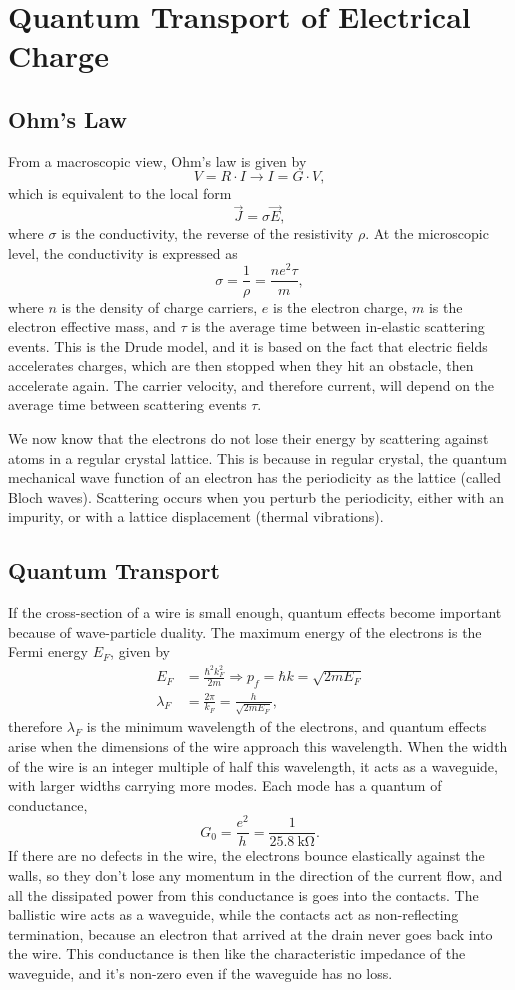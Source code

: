 \documentclass{article}
\begin{document}
\section{Quantum Transport of Electrical Charge}
\subsection{Ohm's Law}
From a macroscopic view, Ohm's law is given by 
\[
    V=R \cdot I \to I=G\cdot V, 
\]
which is equivalent to the local form 
\[
    \vec{J}=\sigma \vec{E},
\]
where $\sigma $ is the conductivity, the reverse of the resistivity $\rho $. At the microscopic level, the conductivity is expressed as 
\[
    \sigma =\frac{1}{\rho }=\frac{ne^2\tau }{m},
\]
where $n$ is the density of charge carriers, $e$ is the electron charge, $m$ is the electron effective mass, and $\tau $ is the average time between in-elastic scattering events. This is the Drude model, and it is based on the fact that electric fields accelerates charges, which are then stopped when they hit an obstacle, then accelerate again. The carrier velocity, and therefore current, will depend on the average time between scattering events $\tau $.

We now know that the electrons do not lose their energy by scattering against atoms in a regular crystal lattice. This is because in regular crystal, the quantum mechanical wave function of an electron has the periodicity as the lattice (called Bloch waves). Scattering occurs when you perturb the periodicity, either with an impurity, or with a lattice displacement (thermal vibrations).

\subsection{Quantum Transport}
If the cross-section of a wire is small enough, quantum effects become important because of wave-particle duality. The maximum energy of the electrons is the Fermi energy $E_F$, given by
\begin{align*}
    E_F &= \frac{\hbar^2k_F^2}{2m}\Rightarrow p_f=\hbar k=\sqrt{2mE_F}\\
    \lambda _F&=\frac{2\pi }{k_F}=\frac{h}{\sqrt{2mE_F}},
\end{align*}
therefore $\lambda _F$ is the minimum wavelength of the electrons, and quantum effects arise when the dimensions of the wire approach this wavelength. When the width of the wire is an integer multiple of half this wavelength, it acts as a waveguide, with larger widths carrying more modes. Each mode has a quantum of conductance, 
\[
    G_0=\frac{e^2}{h}=\frac{1}{\SI{25.8}{\kohm}}.
\]
If there are no defects in the wire, the electrons bounce elastically against the walls, so they don't lose any momentum in the direction of the current flow, and all the dissipated power from this conductance is goes into the contacts. The ballistic wire acts as a waveguide, while the contacts act as non-reflecting termination, because an electron that arrived at the drain never goes back into the wire. This conductance is then like the characteristic impedance of the waveguide, and it's non-zero even if the waveguide has no loss.
\end{document}
